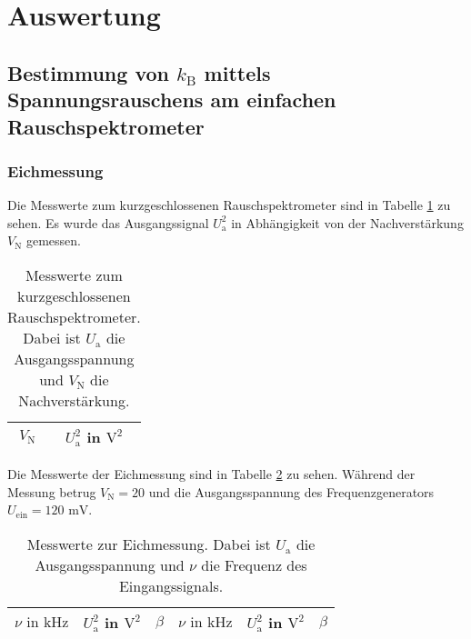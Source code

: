 

\section{Auswertung}

\subsection{Bestimmung von $k_\text{B}$ mittels Spannungsrauschens am
			einfachen Rauschspektrometer}


	\subsubsection{Eichmessung}

		Die Messwerte zum kurzgeschlossenen Rauschspektrometer sind
		in Tabelle \ref{tab:eichung_eigenrauschen_einfach} zu sehen.
		Es wurde das Ausgangssignal $U^2_\text{a}$ in Abhängigkeit von
		der Nachverstärkung $V_\text{N}$ gemessen.

		\begin{table}[h]
		\centering
			\begin{tabular}{cc}
				\toprule \midrule
				$V_\text{N}$ & $U^2_\text{a}$ in $\text{V}^2$
				\\
				\midrule
				
				\midrule \bottomrule
			\end{tabular}
			\caption{Messwerte zum kurzgeschlossenen
			Rauschspektrometer. Dabei ist $U_\text{a}$ die
            Ausgangsspannung und $V_\text{N}$ die Nachverstärkung.}
			\label{tab:eichung_eigenrauschen_einfach}
		\end{table}

		Die Messwerte der Eichmessung sind in Tabelle
		\ref{tab:eichung_einfach} zu sehen. Während der Messung
		betrug $V_\text{N}=20$ und die Ausgangsspannung des
		Frequenzgenerators $U_\text{ein} = 120 \text{ mV}$.

		\begin{table}[h]
		\centering
			\begin{tabular}{ccc|ccc}
				\toprule \midrule
				$\nu \text{ in} \text{ kHz}$ & $U^2_\text{a}$ in $\text{V}^2$ & $\beta$ &
				$\nu \text{ in} \text{ kHz}$ & $U^2_\text{a}$ in $\text{V}^2$ & $\beta$ \\
				\midrule
				
				\midrule \bottomrule
			\end{tabular}
			\caption{Messwerte zur Eichmessung. Dabei ist $U_\text{a}$
			die
			Ausgangsspannung und $\nu$ die Frequenz des
			Eingangssignals. }
			\label{tab:eichung_einfach}
		\end{table}

